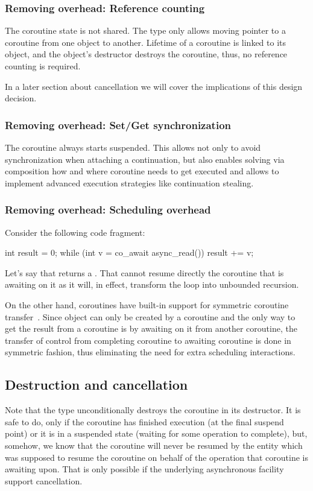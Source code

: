 \subsubsection{Removing  overhead: Reference counting}

The coroutine state is not shared. The  type only allows moving pointer to a coroutine from one  object to another. Lifetime of a coroutine is linked to its  object, and the  object's destructor destroys the coroutine, thus, no reference counting is required.

In a later section about cancellation we will cover the implications of this design decision.

\subsubsection{Removing  overhead: Set/Get synchronization}

The  coroutine always starts suspended. This allows not only to avoid synchronization when attaching a continuation, but also enables solving via composition how and where coroutine needs to get executed and allows to implement advanced execution strategies like continuation stealing.

\subsubsection{Removing  overhead: Scheduling overhead}
Consider the following code fragment:
\begin{codeblock}
int result = 0;
while (int v = co_await async_read())
  result += v;
\end{codeblock}
Let's say that  returns a . That  cannot resume directly the coroutine that is awaiting on it as it will, in effect, transform the loop into unbounded recursion.

On the other hand, coroutines have built-in support for symmetric coroutine transfer~\cite{P0913R1}. Since  object can only be created by a coroutine and the only way to get the result from a coroutine is by awaiting on it from another coroutine, the transfer of control from completing coroutine to awaiting coroutine is done in symmetric fashion, thus eliminating the need for extra scheduling interactions.

\subsection{Destruction and cancellation}
Note that the  type unconditionally destroys the coroutine in its destructor. It is safe to do, only if the coroutine has finished execution (at the final suspend point) or it is in a suspended state (waiting for some operation to complete), but, somehow, we know that the coroutine will never be resumed by the entity which was supposed to resume the coroutine on behalf of the operation that coroutine is awaiting upon. That is only possible if the underlying asynchronous facility support cancellation.

